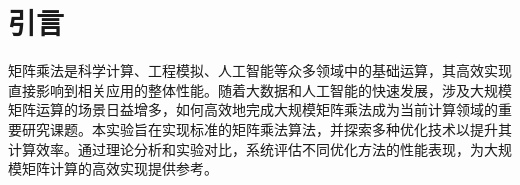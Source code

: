 \documentclass[UTF8,a4paper,10pt]{ctexart}
\newcommand{\xiaosi}{\fontsize{12pt}{18pt}\selectfont}            %
\begin{document}



    






\section{引言}
矩阵乘法是科学计算、工程模拟、人工智能等众多领域中的基础运算，其高效实现直接影响到相关应用的整体性能。随着大数据和人工智能的快速发展，涉及大规模矩阵运算的场景日益增多，如何高效地完成大规模矩阵乘法成为当前计算领域的重要研究课题。本实验旨在实现标准的矩阵乘法算法，并探索多种优化技术以提升其计算效率。通过理论分析和实验对比，系统评估不同优化方法的性能表现，为大规模矩阵计算的高效实现提供参考。
\end{document}
